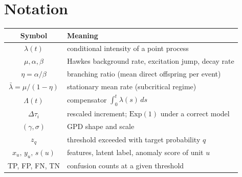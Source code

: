 \documentclass[11pt,a4paper]{report}
\begin{document}
\chapter{Notation}
\begin{table}[H]\centering\small
\renewcommand{\arraystretch}{1.25}
\begin{tabular}{@{}c l@{}}
\toprule
Symbol & Meaning \\
\midrule
$\lambda(t)$ & conditional intensity of a point process \\
$\mu,\alpha,\beta$ & Hawkes background rate, excitation jump, decay rate \\
$\eta=\alpha/\beta$ & branching ratio (mean direct offspring per event) \\
$\bar\lambda=\mu/(1-\eta)$ & stationary mean rate (subcritical regime) \\
$\Lambda(t)$ & compensator $\int_0^t\lambda(s)\,ds$ \\
$\Delta\tau_i$ & rescaled increment; $\mathrm{Exp}(1)$ under a correct
model \\
$(\gamma,\sigma)$ & GPD shape and scale \\
$z_q$ & threshold exceeded with target probability $q$ \\
$x_u,\,y_u,\,s(u)$ & features, latent label, anomaly score of unit $u$ \\
TP, FP, FN, TN & confusion counts at a given threshold \\
\bottomrule
\end{tabular}
\end{table}
\end{document}
